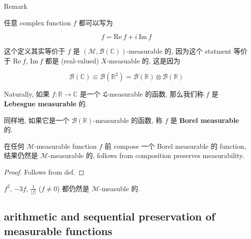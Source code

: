 \begin{qlremark}{Remark}

任意 complex function \(f\) 都可以写为

\[f = \text{Re}\ f + i\ \text{Im}\ f\]

这个定义其实等价于 \(f\) 是 \((\mathcal{M},\mathcal{B}(\mathbb{C}))\)-measurable 的, 因为这个 statment 等价于 \(\text{Re}\ f\), \(\text{Im}\ f\) 都是 (real-valued) \(X\)-measuable 的, 这是因为

\[\mathcal{B}(\mathbb{C}) \equiv \mathcal{B}(\mathbb{R}^{2}) = \mathcal{B}(\mathbb{R}) \otimes \mathcal{B}(\mathbb{R})\]

\end{qlremark}

\begin{definition}{}

Naturally, 如果 \(f:\mathbb{R}\rightarrow\mathbb{C}\) 是一个 \(\mathfrak{L}\)-measurable 的函数, 那么我们称 \(f\) 是 \textbf{Lebesgue measurable} 的.

同样地, 如果它是一个 \(\mathcal{B}(\mathbb{R})\)-measurable 的函数, 称 \(f\) 是 \textbf{Borel measurable} 的.

\end{definition}

\begin{proposition}

在任何 \(\mathcal{M}\)-measurable function \(f\) 前 compose 一个 Borel measurable 的 function, 结果仍然是 \(\mathcal{M}\)-measurable 的, follows from composition preserves measurability.

\end{proposition}

\begin{proof}

Follows from def.

\end{proof}

\begin{example}

\(f^{2}\), \(- 3f\), \(\frac{1}{|f|}\) (\(f \neq 0\)) 都仍然是 \(\mathcal{M}\)-measuble 的.

\end{example}

\subsection{arithmetic and sequential preservation of measurable functions}\label{arithmetic-and-sequential-preservation-of-measurable-functions}

